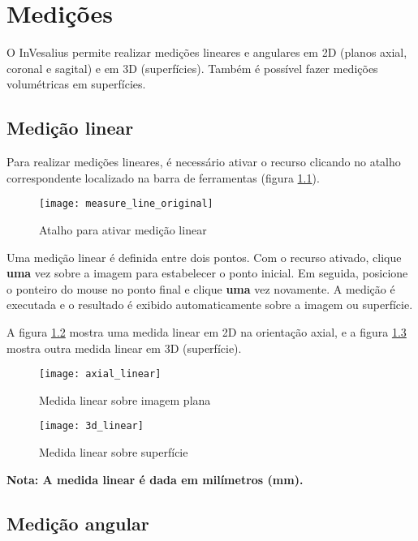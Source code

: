 \chapter{Medições}

O InVesalius permite realizar medições lineares e angulares em 2D (planos axial,
coronal e sagital) e em 3D (superfícies). Também é possível fazer medições
volumétricas em superfícies.

\section{Medição linear}

Para realizar medições lineares, é necessário ativar o recurso clicando no atalho
correspondente localizado na barra de ferramentas (figura \ref{fig:measure_line_original}).

\begin{figure}[!htb]
\centering
\texttt{[image: measure\_line\_original]}
\caption{Atalho para ativar medição linear}
\label{fig:measure_line_original}
\end{figure}

Uma medição linear é definida entre dois pontos. Com o recurso ativado, clique
\textbf{uma} vez sobre a imagem para estabelecer o ponto inicial. Em seguida,
posicione o ponteiro do mouse no ponto final e clique \textbf{uma} vez novamente.
A medição é executada e o resultado é exibido automaticamente sobre a imagem ou
superfície.

A figura \ref{fig:axial_linear} mostra uma medida linear em 2D na orientação axial,
e a figura \ref{fig:3d_linear} mostra outra medida linear em 3D (superfície).

\begin{figure}[!htb]
\centering
\texttt{[image: axial\_linear]}
\caption{Medida linear sobre imagem plana}
\label{fig:axial_linear}
\end{figure}

\begin{figure}[!htb]
\centering
\texttt{[image: 3d\_linear]}
\caption{Medida linear sobre superfície}
\label{fig:3d_linear}
\end{figure}

\newpage

\textbf{Nota: A medida linear é dada em milímetros (mm).}

\section{Medição angular}

